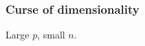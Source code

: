 
\begin{frame}
\frametitle{Curse of dimensionality}
\begin{center}
{\Huge Large $p$, small $n$.\par}
\end{center}
\end{frame}




